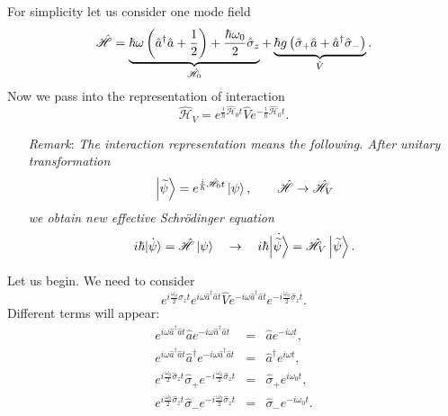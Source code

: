 For simplicity let us consider one mode field
\begin{equation}
	\hat{\mathscr{H}} = \underbrace{\hbar \omega \left( \hat{a}^{\dagger}\hat{a} + \frac{1}{2} \right) + \frac{\hbar \omega_0}{2} \hat{\sigma}_z}_{\hat{\mathscr{H}}_0} + \underbrace{\hbar g \left( \hat{\sigma}_+\hat{a} + \hat{a}^{\dagger} \hat{\sigma}_- \right)}_{\hat{V}}.
	\label{eq:hamillll}
\end{equation}
Now we pass into the representation of interaction
\begin{equation}
	\hat{\mathscr{H}}_V = e^{\frac{i}{\hbar} \hat{\mathscr{H}}_0 t} \hat{V} e^{-\frac{i}{\hbar} \hat{\mathscr{H}}_0 t}.
\end{equation}
\begin{enumerate}
	\item[\textit{Remark}:] \textit{The interaction representation means the following. 
	After unitary transformation }
	\begin{equation*}
	\left\lvert {\widetilde{\psi}} \right\rangle = e^{\frac{i}{\hbar} \hat{\mathscr{H}}_0 t} \left\lvert {\psi} \right\rangle, \qquad \hat{\mathscr{H}} \to \hat{\mathscr{H}}_V
	\end{equation*}
	\textit{we obtain new effective Schrödinger equation}
	\begin{equation*}
	i \hbar \dot{\left\lvert {\psi} \right\rangle} = \hat{\mathscr{H}} \left\lvert {\psi} \right\rangle \quad \to \quad i \hbar \dot{\left\lvert {\widetilde{\psi}} \right\rangle} = \hat{\mathscr{H}}_V \left\lvert {\widetilde{\psi}} \right\rangle.
	\end{equation*}   
\end{enumerate}
Let us begin. We need to consider
\begin{equation}
	e^{i \frac{\omega_0}{2} \hat{\sigma}_z t} e^{i \omega \hat{a}^{\dagger} \hat{a} t} \hat{V} e^{-i \omega \hat{a}^{\dagger} \hat{a} t} e^{-i \frac{\omega_0}{2} \hat{\sigma}_z t}.
\end{equation}
Different terms will appear:
\begin{eqnarray}
	e^{i \omega \hat{a}^{\dagger} \hat{a} t} \hat{a} e^{-i \omega \hat{a}^{\dagger} \hat{a} t} &=& \hat{a} e^{- i\omega t}, \\
	e^{i \omega \hat{a}^{\dagger} \hat{a} t} \hat{a}^{\dagger} e^{-i \omega \hat{a}^{\dagger} \hat{a} t} &=& \hat{a}^{\dagger} e^{i \omega t}, \\
	e^{i \frac{\omega_0}{2} \hat{\sigma}_z t} \hat{\sigma}_+ e^{-i \frac{\omega_0}{2} \hat{\sigma}_z t} &=& \hat{\sigma}_+ e^{i \omega_0 t}, \\
	e^{i \frac{\omega_0}{2} \hat{\sigma}_z t} \hat{\sigma}_- e^{-i \frac{\omega_0}{2} \hat{\sigma}_z t} &=& \hat{\sigma}_- e^{-i \omega_0 t}.
\end{eqnarray}
